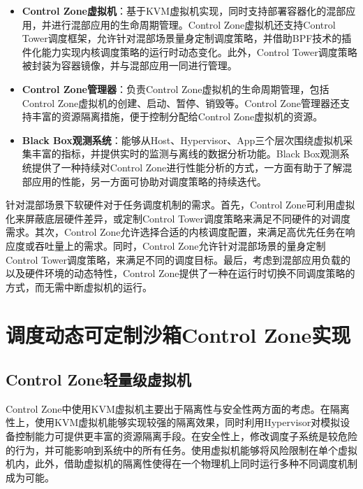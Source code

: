 \begin{itemize}

    \item \textbf{Control Zone虚拟机}：基于KVM虚拟机实现，同时支持部署容器化的混部应用，并进行混部应用的生命周期管理。Control Zone虚拟机还支持Control Tower调度框架，允许针对混部场景量身定制调度策略，并借助BPF技术的插件化能力实现内核调度策略的运行时动态变化。此外，Control Tower调度策略被封装为容器镜像，并与混部应用一同进行管理。

    \item \textbf{Control Zone管理器}：负责Control Zone虚拟机的生命周期管理，包括Control Zone虚拟机的创建、启动、暂停、销毁等。Control Zone管理器还支持丰富的资源隔离措施，便于控制分配给Control Zone虚拟机的资源。

    \item \textbf{Black Box观测系统}：能够从Host、Hypervisor、App三个层次围绕虚拟机采集丰富的指标，并提供实时的监测与离线的数据分析功能。Black Box观测系统提供了一种持续对Control Zone进行性能分析的方式，一方面有助于了解混部应用的性能，另一方面可协助对调度策略的持续迭代。

\end{itemize}

针对混部场景下软硬件对于任务调度机制的需求。首先，Control Zone可利用虚拟化来屏蔽底层硬件差异，或定制Control Tower调度策略来满足不同硬件的对调度需求。其次，Control Zone允许选择合适的内核调度配置，来满足高优先任务在响应度或吞吐量上的需求。同时，Control Zone允许针对混部场景的量身定制Control Tower调度策略，来满足不同的调度目标。最后，考虑到混部应用负载的以及硬件环境的动态特性，Control Zone提供了一种在运行时切换不同调度策略的方式，而无需中断虚拟机的运行。

\section{调度动态可定制沙箱Control Zone实现}

\subsection{Control Zone轻量级虚拟机}


Control Zone中使用KVM虚拟机主要出于隔离性与安全性两方面的考虑。在隔离性上，使用KVM虚拟机能够实现较强的隔离效果，同时利用Hypervisor对模拟设备控制能力可提供更丰富的资源隔离手段。在安全性上，修改调度子系统是较危险的行为，并可能影响到系统中的所有任务。使用虚拟机能够将风险限制在单个虚拟机内，此外，借助虚拟机的隔离性使得在一个物理机上同时运行多种不同调度机制成为可能。

